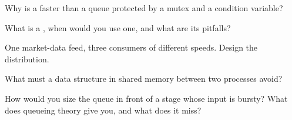 \begin{interviewq}\label{iq:ll:queues-ring-buffers-and-shared-memory:2}
Why is a  faster than a queue protected by a mutex and a condition variable?
\end{interviewq}

\begin{interviewq}\label{iq:ll:queues-ring-buffers-and-shared-memory:3}
What is a , when would you use one, and what are its pitfalls?
\end{interviewq}

\begin{interviewq}\label{iq:ll:queues-ring-buffers-and-shared-memory:4}
One market-data feed, three consumers of different speeds. Design the distribution.
\end{interviewq}

\begin{interviewq}\label{iq:ll:queues-ring-buffers-and-shared-memory:5}
What must a data structure in shared memory between two processes avoid?
\end{interviewq}

\begin{interviewq}\label{iq:ll:queues-ring-buffers-and-shared-memory:6}
How would you size the queue in front of a stage whose input is bursty? What does queueing theory give you, and what does it
miss?
\end{interviewq}
